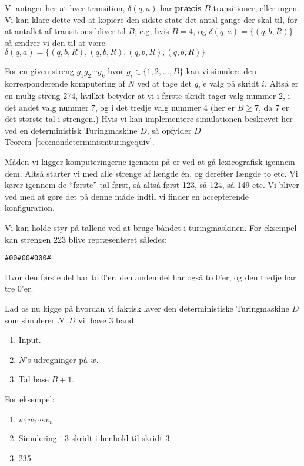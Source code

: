 Vi antager her at hver transition, $\delta(q,a)$ har \textbf{præcis} $B$ transitioner, eller ingen. Vi kan klare dette ved at kopiere den sidste state det antal gange der skal til, for at antallet af transitions bliver til $B$; e.g, hvis $B = 4$, og $\delta(q,a) = \{(q, b, R)\}$ så ændrer vi den til at være $\delta(q,a) = \{(q,b,R),(q,b,R),(q,b,R),(q,b,R)\}$

For en given streng $g_{1}g_{2}\cdots g_{k}$ hvor $g_{i} \in \{1, 2, \ldots, B\}$ kan vi simulere den korresponderende komputering af $N$  ved at tage det $g_{i}$'e valg på skridt $i$. Altså er en mulig streng 274, hvilket betyder at vi i første skridt tager valg nummer 2, i det andet valg nummer 7, og i det tredje valg nummer 4 (her er $B \ge 7$, da 7 er det største tal i strengen.) Hvis vi kan implementere simulationen beskrevet her ved en deterministisk Turingmaskine $D$, så opfylder $D$ Teorem~\ref{teo:nondeterminismturingequiv}.

Måden vi kigger komputeringerne igennem på er ved at gå lexicografisk igennem dem. Altså starter vi med alle strenge af længde én, og derefter længde to etc. Vi kører igennem de ``første'' tal først, så altså først 123, så 124, så 149 etc. Vi bliver ved med at gøre det på denne måde indtil vi finder en accepterende konfiguration.

Vi kan holde styr på tallene ved at bruge båndet i turingmaskinen. For eksempel kan strengen 223 blive repræsenteret således:
\begin{center}
	\texttt{\#00\#00\#000\#}
\end{center}
Hvor den første del har to 0'er, den anden del har også to 0'er, og den tredje har tre 0'er.

Lad os nu kigge på hvordan vi faktisk laver den deterministiske Turingmaskine $D$ som simulerer $N$.
$D$ vil have 3 bånd:
\begin{enumerate}
	\item Input.
	\item $N$'s udregninger på $w$.
	\item Tal base $B+1$.
\end{enumerate}

For eksempel:
\begin{enumerate}
	\item $w_{1}w_{2} \cdots w_{n}$
	\item Simulering i 3 skridt i henhold til skridt 3.
	\item 235
\end{enumerate}

